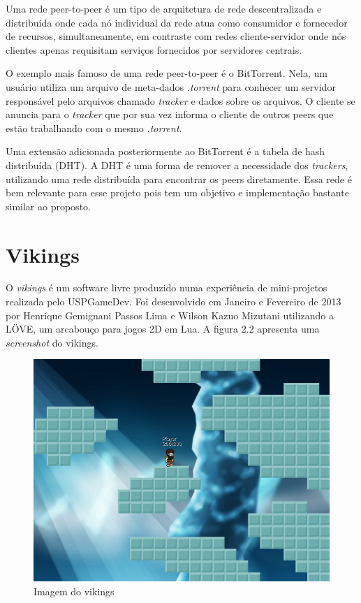   Uma rede peer-to-peer é um tipo de arquitetura de rede descentralizada e distribuída
  onde cada nó individual da rede atua como consumidor e fornecedor de recursos,
  simultaneamente, em contraste com redes cliente-servidor onde nós clientes apenas
  requisitam serviços fornecidos por servidores centrais. \cite{peertopeer:definition}
  
  O exemplo mais famoso de uma rede peer-to-peer é o BitTorrent. Nela, um usuário utiliza um
  arquivo de meta-dados \textit{.torrent} para conhecer um servidor responsável pelo arquivos
  chamado \textit{tracker} e dados sobre os arquivos. O cliente se anuncia para o \textit{tracker} que
  por sua vez informa o cliente de outros peers que estão trabalhando com o mesmo \textit{.torrent}.
  
  Uma extensão adicionada posteriormente ao BitTorrent é a tabela de hash distribuída (DHT).
  A DHT é uma forma de remover a necessidade dos \textit{trackers}, utilizando uma rede distribuída
  para encontrar os peers diretamente. Essa rede é bem relevante para esse projeto pois tem um
  objetivo e implementação bastante similar ao proposto.

\section{Vikings}
\label{sec:conceitos:vikings}
  O \textit{vikings}\footnotemark{} é um software livre produzido numa experiência de mini-projetos
  realizada pelo USPGameDev\footnotemark. Foi desenvolvido em Janeiro e Fevereiro de 2013 por
  Henrique Gemignani Passos Lima e Wilson Kazuo Mizutani utilizando a LÖVE, um arcabouço para jogos
  2D em Lua\footnotemark{}. A figura 2.2 apresenta uma \textit{screenshot} do vikings.
  
  \begin{figure}
    \label{sec:conceitos:vikings:screenshot}
    \includegraphics{imagens/vikings-1.png}
    \caption{Imagem do vikings}
  \end{figure}
  
